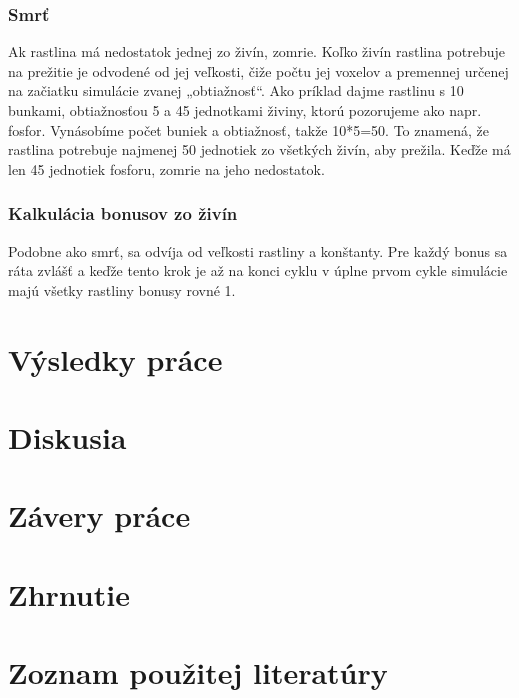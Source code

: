 \documentclass[12pt]{article}
\begin{document}
\subsubsection{Smrť}

Ak rastlina má nedostatok jednej zo živín, zomrie. Koľko živín rastlina
potrebuje na prežitie je odvodené od jej veľkosti, čiže počtu jej voxelov
a premennej určenej na začiatku simulácie zvanej „obtiažnosť“. Ako príklad
dajme rastlinu s 10 bunkami, obtiažnosťou 5 a 45 jednotkami živiny, ktorú
pozorujeme ako napr. fosfor. Vynásobíme počet buniek a obtiažnosť, takže
10*5=50. To znamená, že rastlina potrebuje najmenej 50 jednotiek zo všetkých
živín, aby prežila. Keďže má len 45 jednotiek fosforu, zomrie na jeho
nedostatok.

\subsubsection{Kalkulácia bonusov zo živín}

Podobne ako smrť, sa odvíja od veľkosti rastliny a konštanty. Pre každý bonus
sa ráta zvlášť a keďže tento krok je až na konci cyklu v úplne prvom cykle
simulácie majú všetky rastliny bonusy rovné 1.

\section{Výsledky práce}
\section{Diskusia}
\section{Závery práce}
\section{Zhrnutie}
\section{Zoznam použitej literatúry}
\end{document}
